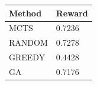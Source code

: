 \begin{tabular}{ll}
\hline
Method & Reward \\
\hline
  MCTS & 0.7236 \\
  RANDOM & 0.7278 \\
  GREEDY & 0.4428 \\
  GA & 0.7176 \\
\hline
\end{tabular}
